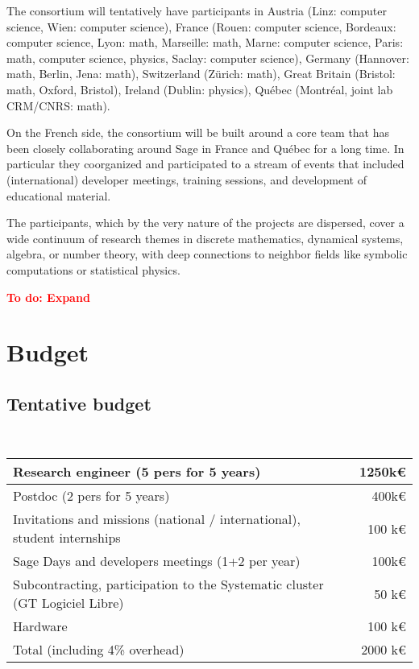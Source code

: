 \documentclass[a4,12pt]{amsart}
\newcommand{\TODO}[2][To do: ]{{\textcolor{red}{\textbf{#1#2}}}}
\newcommand{\CS}{computer science}
\begin{document}
The consortium will tentatively have participants in Austria (Linz:
\CS, Wien: \CS), France (Rouen: \CS, Bordeaux: \CS, Lyon: math,
Marseille: math, Marne: \CS, Paris: math, \CS, physics, Saclay: \CS),
Germany (Hannover: math, Berlin, Jena: math), Switzerland (Zürich:
math), Great Britain (Bristol: math, Oxford, Bristol), Ireland
(Dublin: physics), Québec (Montréal, joint lab CRM/CNRS: math).

On the French side, the consortium will be built around a core team
that has been closely collaborating around Sage in France and Québec
for a long time.
In particular they coorganized and participated to a stream of events
that included (international) developer meetings, training sessions,
and development of educational material.

The participants, which by the very nature of the projects are
dispersed, cover a wide continuum of research themes in discrete
mathematics, dynamical systems, algebra, or number theory, with deep
connections to neighbor fields like symbolic computations or
statistical physics.

\TODO{Expand}



\section{Budget}

\subsection{Tentative budget}
\ \\
\begin{tabular}{|l|r|}\hline
  Research engineer (5 pers for 5 years)                       & 1250k\euro          \\\hline
  Postdoc           (2 pers for 5 years)                       &  400k\euro\\\hline
  Invitations and missions (national / international), student internships & 100 k\euro          \\\hline
  Sage Days and developers meetings (1+2 per year)             & 100k\euro    \\\hline
  Subcontracting, participation to the Systematic cluster (GT Logiciel Libre)  & 50 k\euro\\\hline
  Hardware                                                     & 100 k\euro\\\hline
  Total (including 4\% overhead)                               & 2000 k\euro\\\hline
\end{tabular}
\end{document}
